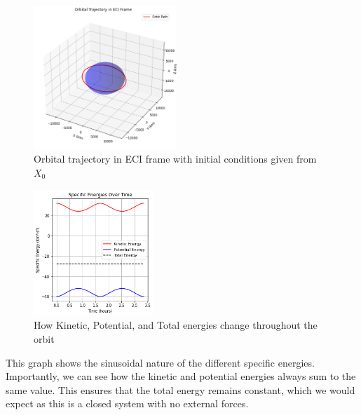 \documentclass[12pt,twocolumn]{article}  %
\begin{document}
\begin{figure}[H]
    \centering
    \includegraphics[width=0.48\textwidth]{Images/123-3d.png}
    \caption{Orbital trajectory in ECI frame with initial conditions given from $X_0$}
\end{figure}

\begin{figure}[H]
    \centering
    \includegraphics[width=0.4\textwidth]{Images/124-energies.png}
    \caption{How Kinetic, Potential, and Total energies change throughout the orbit }
\end{figure}

This graph shows the sinusoidal nature of the different specific energies. Importantly, we can see how the 
kinetic and potential energies always sum to the same value. This ensures that the total energy remains constant, which we would expect 
as this is a closed system with no external forces. 
\end{document}
